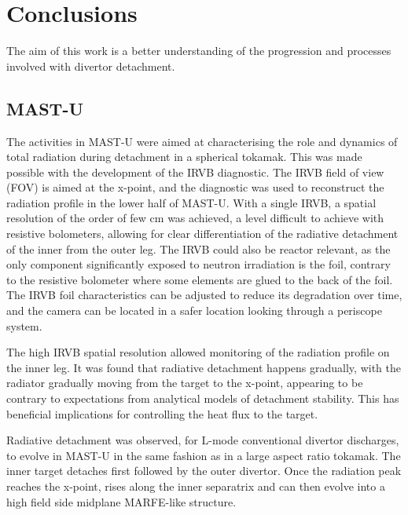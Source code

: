 \chapter{Conclusions}\label{chapter4}

The aim of this work is a better understanding of the progression and processes involved with divertor detachment. %

\section{MAST-U}

The activities in MAST-U were aimed at characterising the role and dynamics of total radiation during detachment in a spherical tokamak. This was made possible with the development of the IRVB diagnostic. The IRVB field of view (FOV) is aimed at the x-point, and the diagnostic was used to reconstruct the radiation profile in the lower half of MAST-U. With a single IRVB, a spatial resolution of the order of few cm was achieved, a level difficult to achieve with resistive bolometers, allowing for clear differentiation of the radiative detachment of the inner from the outer leg. The IRVB could also be reactor relevant, as the only component significantly exposed to neutron irradiation is the foil, contrary to the resistive bolometer where some elements are glued to the back of the foil. The IRVB foil characteristics can be adjusted to reduce its degradation over time, and the camera can be located in a safer location looking through a periscope system.

The high IRVB spatial resolution allowed monitoring of the radiation profile on the inner leg. It was found that radiative detachment happens gradually, with the radiator gradually moving from the target to the x-point, appearing to be contrary to expectations from analytical models of detachment stability. This has beneficial implications for controlling the heat flux to the target.

Radiative detachment was observed, for L-mode conventional divertor discharges, to evolve in MAST-U in the same fashion as in a large aspect ratio tokamak. The inner target detaches first followed by the outer divertor. Once the radiation peak reaches the x-point, rises along the inner separatrix and can then evolve into a high field side midplane MARFE-like structure.

